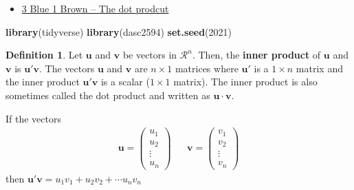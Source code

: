 \documentclass[
]{book}
\newenvironment{Shaded}{\begin{snugshade}}{\end{snugshade}}
\newcommand{\DecValTok}[1]{\textcolor[rgb]{0.00,0.00,0.81}{#1}}
\newcommand{\KeywordTok}[1]{\textcolor[rgb]{0.13,0.29,0.53}{\textbf{#1}}}
\newcommand{\NormalTok}[1]{#1}
\providecommand{\tightlist}{%
  \setlength{\itemsep}{0pt}\setlength{\parskip}{0pt}}
\theoremstyle{definition}
\newtheorem{definition}{Definition}[chapter]
\theoremstyle{definition}
\theoremstyle{definition}
\theoremstyle{definition}
\theoremstyle{remark}
\begin{document}
\begin{itemize}
\tightlist
\item
  \href{https://www.3blue1brown.com/lessons/dot-products}{3 Blue 1 Brown -- The dot prodcut}
\end{itemize}

\begin{Shaded}
\begin{Highlighting}[]
\KeywordTok{library}\NormalTok{(tidyverse)}
\KeywordTok{library}\NormalTok{(dasc2594)}
\KeywordTok{set.seed}\NormalTok{(}\DecValTok{2021}\NormalTok{)}
\end{Highlighting}
\end{Shaded}

\begin{definition}
Let \(\mathbf{u}\) and \(\mathbf{v}\) be vectors in \(\mathcal{R}^n\). Then, the \textbf{inner product} of \(\mathbf{u}\) and \(\mathbf{v}\) is \(\mathbf{u}' \mathbf{v}\). The vectors \(\mathbf{u}\) and \(\mathbf{v}\) are \(n \times 1\) matrices where \(\mathbf{u}'\) is a \(1 \times n\) matrix and the inner product \(\mathbf{u}' \mathbf{v}\) is a scalar (\(1 \times 1\) matrix). The inner product is also sometimes called the dot product and written as \(\mathbf{u} \cdot \mathbf{v}\).

If the vectors
\[
\begin{aligned}
\mathbf{u} = \begin{pmatrix} u_1 \\ u_2 \\ \vdots \\ u_n \end{pmatrix} & & \mathbf{v} = \begin{pmatrix} v_1 \\ v_2 \\ \vdots \\ v_n \end{pmatrix} 
\end{aligned}
\]
then \(\mathbf{u}' \mathbf{v} = u_1 v_1 + u_2 v_2 + \cdots u_n v_n\)
\end{definition}
\end{document}
